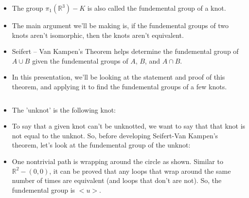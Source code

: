 \documentclass[8pt]{beamer}
\begin{document}
\begin{frame}
\begin{columns}
\begin{column}[T]{0.5\textwidth}
\begin{itemize}
          \item
            The group $\pi_1(\mathbb{R}^3) - K$ is also called the fundemental
            group of a knot.

          \item
            The main argument we'll be making is, if the fundemental groups of
            two knots aren't isomorphic, then the knots aren't equivalent.

          \item
            Seifert -- Van Kampen's Theorem helps determine the fundemental
            group of $A \cup B$ given the fundemental groups of $A$, $B$, and
            $A \cap B$.

          \item
            In this presentation, we'll be looking at the statement and proof
            of this theorem, and applying it to find the fundemental groups of a
            few knots.
        \end{itemize}
      \end{column}
    \end{columns}
  \end{frame}
  \begin{frame}
    \begin{columns}
      \begin{column}[T]{0.5\textwidth}
        \begin{itemize}
          \item The 'unknot' is the following knot:
          \item To say that a given knot can't be unknotted, we want to say
            that that knot is not equal to the unknot. So, before developing
            Seifert-Van Kampen's theorem, let's look at the fundemental group of
            the unknot:
          \item One nontrivial path is wrapping around the circle as shown.
            Similar to $\mathbb{R}^2-(0,0)$, it can be proved that any loops
            that wrap around the same number of times are equivalent (and loops
            that don't are not). So, the fundemental group is $<u>$.
        \end{itemize}
      \end{column}
    \end{columns}
  \end{frame}
\end{document}
